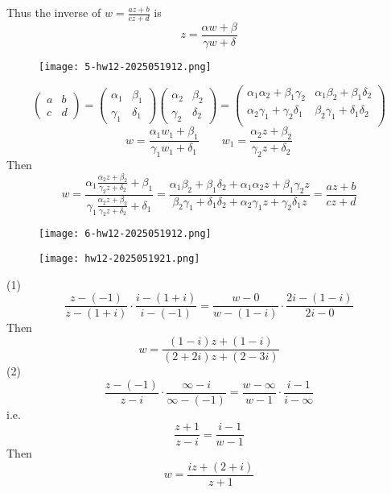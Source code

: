 Thus the inverse of $w=\frac{az+b}{cz+d}$ is
\[
z=\frac{\alpha w+\beta}{\gamma w+\delta}
\]
\begin{exercise}
\begin{figure}[H]
\centering
\texttt{[image: 5-hw12-2025051912.png]}
\label{}
\end{figure}
\end{exercise}
\[
\begin{pmatrix}
a & b \\
c & d
\end{pmatrix} = \begin{pmatrix}
\alpha_1 & \beta_1 \\
\gamma_1 & \delta_1
\end{pmatrix} \begin{pmatrix}
\alpha_2 & \beta_2 \\
\gamma_2 & \delta_2
\end{pmatrix}=\left(
\begin{array}{cc}
 \alpha _1 \alpha _2+\beta _1 \gamma _2 & \alpha _1 \beta _2+\beta _1 \delta _2 \\
 \alpha _2 \gamma _1+\gamma _2 \delta _1 & \beta _2 \gamma _1+\delta _1 \delta _2 \\
\end{array}
\right)
\]
\[
w=\frac{\alpha_{1}w_{1}+\beta_{1}}{\gamma_{1}w_{1}+\delta_{1}}\qquad w_{1}=\frac{\alpha_{2}z+\beta_{2}}{\gamma_{2}z+\delta_{2}}
\]
Then
\[
w=\frac{\alpha_{1}\frac{\alpha_{2}z+\beta_{2}}{\gamma_{2}z+\delta_{2}}+\beta_{1}}{\gamma_{1}\frac{\alpha_{2}z+\beta_{2}}{\gamma_{2}z+\delta_{2}}+\delta_{1}}=\frac{\alpha _1 \beta _2+\beta _1 \delta _2+\alpha _1 \alpha _2 z+\beta _1 \gamma _2 z}{\beta _2 \gamma _1+\delta _1 \delta _2+\alpha _2 \gamma _1 z+\gamma _2 \delta _1 z}=\frac{az+b}{cz+d}
\]
\begin{exercise}
\begin{figure}[H]
\centering
\texttt{[image: 6-hw12-2025051912.png]}
\label{}
\end{figure}
\end{exercise}
\begin{figure}[H]
\centering
\texttt{[image: hw12-2025051921.png]}
\label{}
\end{figure}

(1)
\[
\frac{z-(-1)}{z-(1+i)}\cdot\frac{i-(1+i)}{i-(-1)}=\frac{w-0}{w-(1-i)}\cdot\frac{2i-(1-i)}{2i-0}
\]
Then
\[
w=\frac{(1-i) z+(1-i)}{(2+2 i) z+(2-3 i)}
\]
(2)
\[
\frac{z-(-1)}{z-i}\cdot\frac{\infty-i}{\infty-(-1)}=\frac{w-\infty}{w-1}\cdot\frac{i-1}{i-\infty}
\]
i.e.
\[
\frac{z+1}{z-i}=\frac{i-1}{w-1}
\]
Then
\[
w=\frac{i z+(2+i)}{z+1}
\]